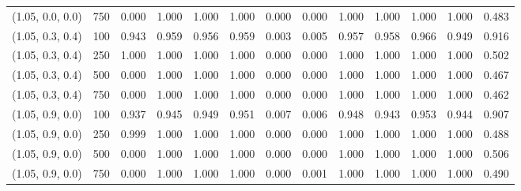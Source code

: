 \begin{table}[ht]
{\begin{tabular}{ll|ccccccccccc}
(1.05, 0.0, 0.0) & 750 & 0.000 & 1.000 & 1.000 & 1.000 & 0.000 & 0.000 & 1.000 & 1.000 & 1.000 & 1.000 & 0.483 \\
(1.05, 0.3, 0.4) & 100 & 0.943 & 0.959 & 0.956 & 0.959 & 0.003 & 0.005 & 0.957 & 0.958 & 0.966 & 0.949 & 0.916 \\
(1.05, 0.3, 0.4) & 250 & 1.000 & 1.000 & 1.000 & 1.000 & 0.000 & 0.000 & 1.000 & 1.000 & 1.000 & 1.000 & 0.502 \\
(1.05, 0.3, 0.4) & 500 & 0.000 & 1.000 & 1.000 & 1.000 & 0.000 & 0.000 & 1.000 & 1.000 & 1.000 & 1.000 & 0.467 \\
(1.05, 0.3, 0.4) & 750 & 0.000 & 1.000 & 1.000 & 1.000 & 0.000 & 0.000 & 1.000 & 1.000 & 1.000 & 1.000 & 0.462 \\
(1.05, 0.9, 0.0) & 100 & 0.937 & 0.945 & 0.949 & 0.951 & 0.007 & 0.006 & 0.948 & 0.943 & 0.953 & 0.944 & 0.907 \\
(1.05, 0.9, 0.0) & 250 & 0.999 & 1.000 & 1.000 & 1.000 & 0.000 & 0.000 & 1.000 & 1.000 & 1.000 & 1.000 & 0.488 \\
(1.05, 0.9, 0.0) & 500 & 0.000 & 1.000 & 1.000 & 1.000 & 0.000 & 0.000 & 1.000 & 1.000 & 1.000 & 1.000 & 0.506 \\
(1.05, 0.9, 0.0) & 750 & 0.000 & 1.000 & 1.000 & 1.000 & 0.000 & 0.001 & 1.000 & 1.000 & 1.000 & 1.000 & 0.490 \\
\hline
\end{tabular}

    }
    \end{table}
    


    

